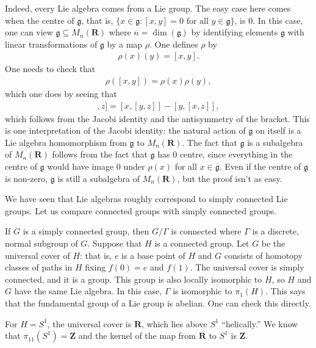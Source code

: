 \documentclass [11 pt, twoside] {article}
\begin{document}
Indeed, every Lie algebra comes from a Lie group.
The easy case here comes when the centre of $\mathfrak{g}$, that is, $\{x\in \mathfrak{g} : \textrm{$[x,y]=0$ for all $y\in \mathfrak{g}$}\}$, is $0$.
In this case, one can view $\mathfrak{g}\subseteq M_{n}(\mathbf{R})$ where $n = \dim(\mathfrak{g})$ by identifying elements $\mathfrak{g}$ with linear transformations of $\mathfrak{g}$ by a map $\rho$. One defines $\rho$ by 
\begin{align*}
	\rho(x) (y) = [x,y].
\end{align*}
One needs to check that 
\begin{align*}
	\rho([x,y]) = \rho (x)\rho (y),
\end{align*}
which one does by seeing that
\begin{align*}
	[[x,y],z] = [x,[y,z]] - [y,[x,z]],
\end{align*}
which follows from the Jacobi identity and the antisymmetry of the bracket.
This is one interpretation of the Jacobi identity: the natural action of $\mathfrak{g}$ on itself is a Lie algebra homomorphism from $\mathfrak{g}$ to $M_{n}(\mathbf{R})$.
The fact that $\mathfrak{g}$ is a subalgebra of $M_{n}(\mathbf{R})$ follows from the fact that $\mathfrak{g}$ has $0$ centre, since everything in the centre of $\mathfrak{g}$ would have image $0$ under $\rho(x)$ for all $x\in \mathfrak{g}$.
Even if the centre of $\mathfrak{g}$ is non-zero, $\mathfrak{g}$ is still a subalgebra of $M_{n}(\mathbf{R})$, but the proof isn't as easy.


We have seen that Lie algebras roughly correspond to simply connected Lie groups.
Let us compare connected groups with simply connected groups.

If $G$ is a simply connected group, then $G/\Gamma$ is connected where $\Gamma$ is a discrete, normal subgroup of $G$. 
Suppose that $H$ is a connected group. Let $G$ be the universal cover of $H$: that is, $e$ is a base point of $H$ and $G$ consists of homotopy classes of paths in $H$ fixing $f(0) =e$ and $f(1)$. The universal cover is simply connected, and it is a group. This group is also locally isomorphic to $H$, so $H$ and $G$ have the same Lie algebra. 
In this case, $\Gamma$ is isomorphic to $\pi_1(H)$.
This says that the fundamental group of a Lie group is abelian. 
One can check this directly.

\begin{example}[ ]\label{}\text{}
For $H=S^{1}$, the universal cover is $\mathbf{R}$, which lies above $S^{1}$ ``helically.'' We know that $\pi_{11}(S^{1}) =\mathbf{Z}$ and the kernel of the map from $\mathbf{R}$ to $S^{1}$ is $\mathbf{Z}$.
\end{example}
\end{document}
